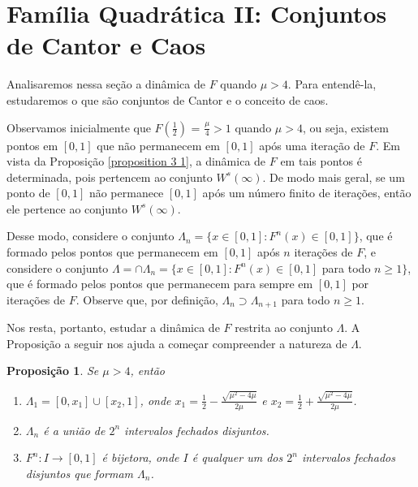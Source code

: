\documentclass[a4paper, 12pt]{article}
\theoremstyle{definition}
\theoremstyle{plain}
\newtheorem{proposition}[definition]{Proposição}
\theoremstyle{plain}
\theoremstyle{plain}
\theoremstyle{remark}
\begin{document}
\section{Família Quadrática II: Conjuntos de Cantor e Caos}

Analisaremos nessa seção a dinâmica de $F$ quando $\mu > 4$. Para entendê-la, estudaremos o que são conjuntos de Cantor e o conceito de caos.

Observamos inicialmente que $F(\frac{1}{2})$ = $\frac{\mu}{4} > 1$ quando $\mu > 4$, ou seja, existem pontos em $[0, 1]$ que não permanecem em $[0, 1]$ após uma iteração de $F$. Em vista da Proposição \ref{proposition 3 1}, a dinâmica de $F$ em tais pontos é determinada, pois pertencem ao conjunto $W^s(\infty)$. De modo mais geral, se um ponto de $[0, 1]$ não permanece $[0, 1]$ após um número finito de iterações, então ele pertence ao conjunto $W^s(\infty)$. 

Desse modo, considere o conjunto $\Lambda_n = \{x \in [0, 1] : F^n(x) \in [0, 1]\}$, que é formado pelos pontos que permanecem em $[0, 1]$ após $n$ iterações de $F$, e considere o conjunto $\Lambda = \cap \Lambda_n = \{x \in [0, 1] : F^n(x) \in [0, 1]$ para todo $n \geq 1\}$, que é formado pelos pontos que permanecem para sempre em $[0, 1]$ por iterações de $F$. Observe que, por definição, $\Lambda_n \supset \Lambda_{n+1}$ para todo $n \geq 1$.

Nos resta, portanto, estudar a dinâmica de $F$ restrita ao conjunto $\Lambda$. A Proposição a seguir nos ajuda a começar compreender a natureza de $\Lambda$.

\begin{proposition}
\label{proposition 4 1}
Se $\mu > 4$, então
\begin{enumerate}
\item $\Lambda_1 = [0, x_1] \cup [x_2, 1]$, onde $x_1 = \frac{1}{2} - \frac{\sqrt{\mu^2 - 4\mu}}{2\mu}$ e $x_2 = \frac{1}{2} + \frac{\sqrt{\mu^2 - 4\mu}}{2\mu}$.
\item $\Lambda_n$ é a união de $2^n$ intervalos fechados disjuntos.
\item $F^n: I \rightarrow [0, 1]$ é bijetora, onde $I$ é qualquer um dos $2^n$ intervalos fechados disjuntos que formam $\Lambda_n$.
\end{enumerate}
\end{proposition}
\end{document}
